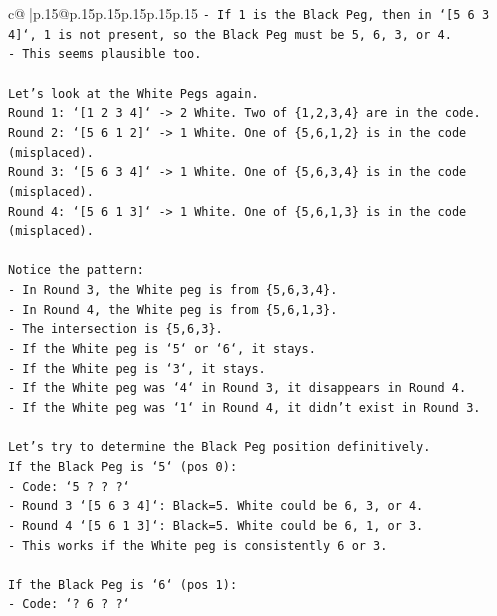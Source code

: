 \documentclass{article}
\begin{document}
{\begin{supertabular}{c@{$\;$}|p{.15\linewidth}@{}p{.15\linewidth}p{.15\linewidth}p{.15\linewidth}p{.15\linewidth}p{.15\linewidth}}
{{{\texttt{{-} If 1 is the Black Peg, then in `{[}5 6 3 4{]}`, 1 is not present, so the Black Peg must be 5, 6, 3, or 4.} \\
\texttt{{-} This seems plausible too.} \\
\\ 
\texttt{Let's look at the White Pegs again.} \\
\texttt{Round 1: `{[}1 2 3 4{]}` {-}> 2 White. Two of \{1,2,3,4\} are in the code.} \\
\texttt{Round 2: `{[}5 6 1 2{]}` {-}> 1 White. One of \{5,6,1,2\} is in the code (misplaced).} \\
\texttt{Round 3: `{[}5 6 3 4{]}` {-}> 1 White. One of \{5,6,3,4\} is in the code (misplaced).} \\
\texttt{Round 4: `{[}5 6 1 3{]}` {-}> 1 White. One of \{5,6,1,3\} is in the code (misplaced).} \\
\\ 
\texttt{Notice the pattern:} \\
\texttt{{-} In Round 3, the White peg is from \{5,6,3,4\}.} \\
\texttt{{-} In Round 4, the White peg is from \{5,6,1,3\}.} \\
\texttt{{-} The intersection is \{5,6,3\}.} \\
\texttt{{-} If the White peg is `5` or `6`, it stays.} \\
\texttt{{-} If the White peg is `3`, it stays.} \\
\texttt{{-} If the White peg was `4` in Round 3, it disappears in Round 4.} \\
\texttt{{-} If the White peg was `1` in Round 4, it didn't exist in Round 3.} \\
\\ 
\texttt{Let's try to determine the Black Peg position definitively.} \\
\texttt{If the Black Peg is `5` (pos 0):} \\
\texttt{{-} Code: `5 ? ? ?`} \\
\texttt{{-} Round 3 `{[}5 6 3 4{]}`: Black=5. White could be 6, 3, or 4.} \\
\texttt{{-} Round 4 `{[}5 6 1 3{]}`: Black=5. White could be 6, 1, or 3.} \\
\texttt{{-} This works if the White peg is consistently 6 or 3.} \\
\\ 
\texttt{If the Black Peg is `6` (pos 1):} \\
\texttt{{-} Code: `? 6 ? ?`} \\
}}}
\end{supertabular}}
\end{document}
